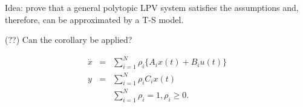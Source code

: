 \begin{frame}
	Idea: prove that a general polytopic LPV system satisfies the assumptions and, therefore, can be approximated by a T-S model. 
	
	(??) Can the corollary be applied?
	
	\begin{eqnarray} 
    \dot{x} &=& \displaystyle  \sum_{i=1}^{N}\rho_i\{A_ix(t)+B_iu(t)\}\\
y&=& \displaystyle  \sum_{i=1}^{N}\rho_iC_ix(t)\\
&& \displaystyle\sum_{i=1}^{N}\rho_i = 1, \displaystyle \rho_i \geq 0.
\end{eqnarray}

\end{frame}



